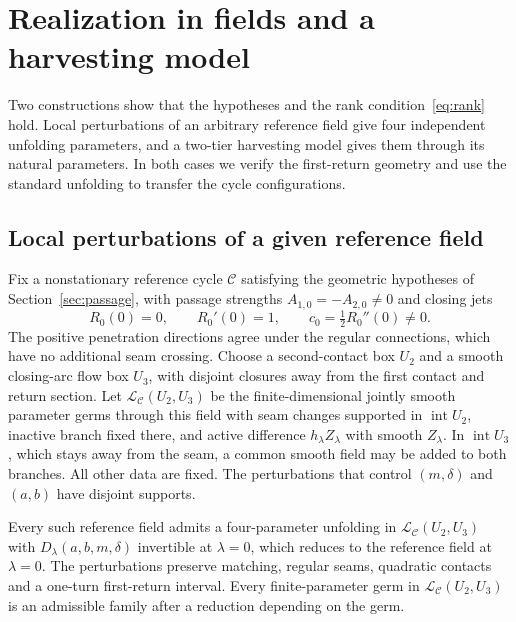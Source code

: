 \section{Realization in fields and a harvesting model}
\label{sec:sharpness}

Two constructions show that the hypotheses and the rank
condition~\eqref{eq:rank} hold. Local perturbations of an arbitrary reference
field give four independent unfolding parameters, and a two-tier harvesting
model gives them through its natural parameters. In both cases we verify the
first-return geometry and use the standard unfolding to transfer the cycle
configurations.

\subsection{Local perturbations of a given reference field}
\label{subsec:specified-field}

Fix a nonstationary reference cycle \(\mathcal C\) satisfying the geometric
hypotheses of Section~\ref{sec:passage}, with passage strengths
\(A_{1,0}=-A_{2,0}\ne0\) and closing jets
\[
 R_0(0)=0,\qquad R_0'(0)=1,\qquad
 c_0=\tfrac12R_0''(0)\ne0.
\]
The positive penetration directions agree under the regular connections,
which have no additional seam crossing. Choose a second-contact box \(U_2\)
and a smooth closing-arc flow box \(U_3\), with disjoint closures away from
the first contact and return section.
Let \(\mathcal L_{\mathcal C}(U_2,U_3)\) be the finite-dimensional
jointly smooth parameter germs through this field with seam changes
supported in \(\operatorname{int}U_2\), inactive branch fixed there,
and active difference \(h_\lambda Z_\lambda\) with smooth
\(Z_\lambda\). In \(\operatorname{int}U_3\), which stays away
from the seam, a common smooth field may be added to both branches.
All other data are fixed. The perturbations that control \((m,\delta)\)
and \((a,b)\) have disjoint supports.

\begin{proposition}
\label{prop:specified-rank}
Every such reference field admits a four-parameter unfolding in
\(\mathcal L_{\mathcal C}(U_2,U_3)\) with
\(D_\lambda(a,b,m,\delta)\) invertible at \(\lambda=0\), which reduces to the
reference field at \(\lambda=0\). The perturbations preserve matching,
regular seams, quadratic contacts and a one-turn first-return interval.
Every finite-parameter germ in \(\mathcal L_{\mathcal C}(U_2,U_3)\) is an
admissible family after a reduction depending on the germ.
\end{proposition}

